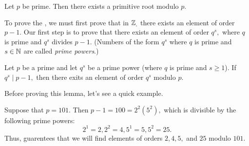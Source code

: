 \documentclass[letterpaper, 11 pt]{ximera}
\theoremstyle{definition}
\begin{document}
\begin{thm*}\label{thm:prime-roots}
    Let $p$ be prime. Then there exists a primitive root modulo $p.$
\end{thm*}
To prove the , we must first prove that in $\mathbb Z_,$ there exists an element of order $p-1.$ Our first step is to prove that there exists an element of order $q^s,$ where $q$ is prime and $q^s$ divides $p-1$. (Numbers of the form $q^s$ where $q$ is prime and $s\in\mathbb N$ are called \emph{prime powers}.)


\begin{lem*}[Lemma 10.3.4]\label{read-lem:prime-power-order}
    Let $p$ be a prime and let $q^s$ be a prime power (where $q$ is prime and $s\geq 1$). If $q^s\mid p-1,$ then there exits an element of order $q^s$ modulo $p.$
\end{lem*}

Before proving this lemma, let's see a quick example.

\begin{example}\label{ex:orders_101}
    Suppose that $p=101.$ Then $p-1=100=2^2(5^2),$ which is divisible by the following prime powers: \[2^1=2, 2^2=4,5^1=5, 5^2=25.\]
    Thus,  guarentees that we will find elements of orders $2,4,5,$ and $25$ modulo $101.$
\end{example}
\end{document}
